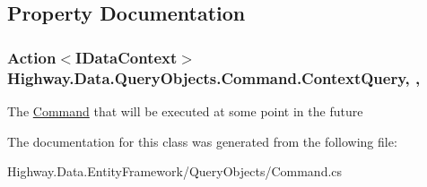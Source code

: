 \subsection{Property Documentation}
\hypertarget{class_highway_1_1_data_1_1_query_objects_1_1_command_a83c9845e7df1f9ff350d05182c23e373}{
\subsubsection[{Context\-Query}]{\setlength{\rightskip}{0pt plus 5cm}Action$<${\bf I\-Data\-Context}$>$ Highway.\-Data.\-Query\-Objects.\-Command.\-Context\-Query\hspace{0.3cm}{\ttfamily [get]}, {\ttfamily [set]}, {\ttfamily [protected]}}}\label{class_highway_1_1_data_1_1_query_objects_1_1_command_a83c9845e7df1f9ff350d05182c23e373}


The \hyperlink{class_highway_1_1_data_1_1_query_objects_1_1_command}{Command} that will be executed at some point in the future 



The documentation for this class was generated from the following file\-:\begin{DoxyCompactItemize}
\item 
Highway.\-Data.\-Entity\-Framework/\-Query\-Objects/Command.\-cs\end{DoxyCompactItemize}

